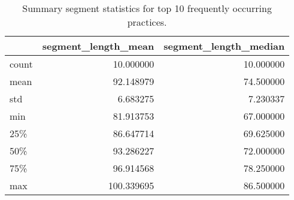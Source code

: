 \begin{table}[htb]
	\centering
	\begin{tabular}{lrr}
	\toprule
	{} &  segment\_length\_mean &  segment\_length\_median \\
	\midrule
	count &            10.000000 &              10.000000 \\
	mean  &            92.148979 &              74.500000 \\
	std   &             6.683275 &               7.230337 \\
	min   &            81.913753 &              67.000000 \\
	25\%   &            86.647714 &              69.625000 \\
	50\%   &            93.286227 &              72.000000 \\
	75\%   &            96.914568 &              78.250000 \\
	max   &           100.339695 &              86.500000 \\
	\bottomrule
	\end{tabular}
	\caption{Summary segment statistics for top 10 frequently occurring practices.}
  \end{table}

